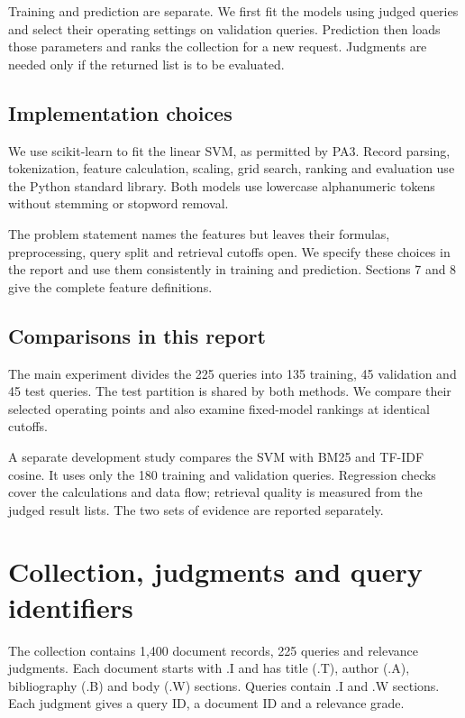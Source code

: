 \documentclass[12pt,a4paper]{article}
\begin{document}
Training and prediction are separate. We first fit the models using judged queries and select their operating settings on validation queries. Prediction then loads those parameters and ranks the collection for a new request. Judgments are needed only if the returned list is to be evaluated.

\subsection{Implementation choices}
We use scikit-learn to fit the linear SVM, as permitted by PA3. Record parsing, tokenization, feature calculation, scaling, grid search, ranking and evaluation use the Python standard library. Both models use lowercase alphanumeric tokens without stemming or stopword removal.

The problem statement names the features but leaves their formulas, preprocessing, query split and retrieval cutoffs open. We specify these choices in the report and use them consistently in training and prediction. Sections 7 and 8 give the complete feature definitions.

\subsection{Comparisons in this report}
The main experiment divides the 225 queries into 135 training, 45 validation and 45 test queries. The test partition is shared by both methods. We compare their selected operating points and also examine fixed-model rankings at identical cutoffs.

A separate development study compares the SVM with BM25 and TF-IDF cosine. It uses only the 180 training and validation queries. Regression checks cover the calculations and data flow; retrieval quality is measured from the judged result lists. The two sets of evidence are reported separately.

\section{Collection, judgments and query identifiers}
The collection contains 1,400 document records, 225 queries and relevance judgments. Each document starts with .I and has title (.T), author (.A), bibliography (.B) and body (.W) sections. Queries contain .I and .W sections. Each judgment gives a query ID, a document ID and a relevance grade.
\end{document}
